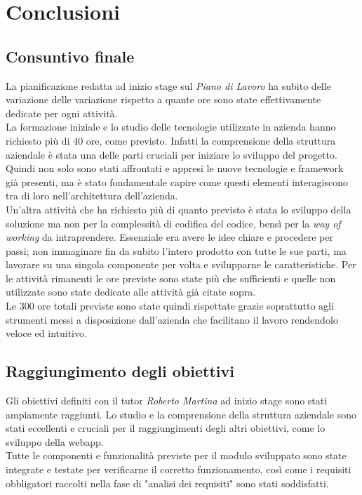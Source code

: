 \chapter{Conclusioni}
\label{cap:conclusioni}

\section{Consuntivo finale}
La pianificazione redatta ad inizio stage sul \textit{Piano di Lavoro} ha subito delle variazione delle variazione rispetto a quante ore sono state effettivamente dedicate per ogni attività.\\ La formazione iniziale e lo studio delle tecnologie utilizzate in azienda hanno richiesto più di 40 ore, come previsto. Infatti la comprensione della struttura aziendale è stata una delle parti cruciali per iniziare lo sviluppo del progetto. Quindi non solo sono stati affrontati e appresi le nuove tecnologie e framework già presenti, ma è stato fondamentale capire come questi elementi interagiscono tra di loro nell'architettura dell'azienda. \\
Un'altra attività che ha richiesto più di quanto previsto è stata lo sviluppo della soluzione ma non per la complessità di codifica del codice, bensì per la \textit{way of working} da intraprendere. Essenziale era avere le idee chiare e procedere per passi; non immaginare fin da subito l'intero prodotto con tutte le sue parti, ma lavorare su una singola componente per volta e svilupparne le caratteristiche. 
Per le attività rimanenti le ore previste sono state più che sufficienti e quelle non utilizzate sono state dedicate alle attività già citate sopra. \\
Le 300 ore totali previste sono state quindi rispettate grazie soprattutto agli strumenti messi a disposizione dall'azienda che facilitano il lavoro rendendolo veloce ed intuitivo.

\section{Raggiungimento degli obiettivi}
Gli obiettivi definiti con il tutor \textit{Roberto Martina} ad inizio stage sono stati ampiamente raggiunti. Lo studio e la comprensione della struttura aziendale sono stati eccellenti e cruciali per il raggiungimenti degli altri obiettivi, come lo sviluppo della webapp. \\
Tutte le componenti e funzionalità previste per il modulo sviluppato sono state integrate e testate per verificarne il corretto funzionamento, così come i requisiti obbligatori raccolti nella fase di "analisi dei requisiti" sono stati soddisfatti. 
\newpage
